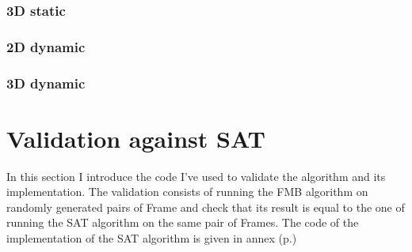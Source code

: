 \documentclass[12pt, a4paper]{article}
\begin{document}
\begin{scriptsize}
\begin{ttfamily}

\end{ttfamily}
\end{scriptsize}

\subsubsection{3D static}

\begin{scriptsize}
\begin{ttfamily}

\end{ttfamily}
\end{scriptsize}

\subsubsection{2D dynamic}

\begin{scriptsize}
\begin{ttfamily}

\end{ttfamily}
\end{scriptsize}

\subsubsection{3D dynamic}

\begin{scriptsize}
\begin{ttfamily}

\end{ttfamily}
\end{scriptsize}

\section{Validation against SAT}

In this section I introduce the code I've used to validate the algorithm and its implementation. The validation consists of running the FMB algorithm on randomly generated pairs of Frame and check that its result is equal to the one of running the SAT algorithm on the same pair of Frames. The code of the implementation of the SAT algorithm is given in annex (p.\pageref{sat_implementation})\\
\end{document}
